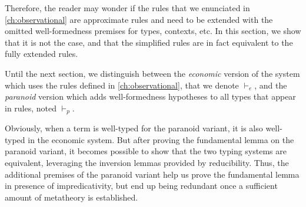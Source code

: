 Therefore, the reader may wonder if the rules that we enunciated in 
\cref{ch:observational} are approximate rules and need to be extended 
with the omitted well-formedness premises for types, contexts, etc.
% 
In this section, we show that it is not the case, and that the simplified 
rules are in fact equivalent to the fully extended rules.

% 
Until the next section, we distinguish between the \emph{economic} version of the 
system which uses the rules defined in \cref{ch:observational}, that we denote 
\( \vdash_e \), and the \emph{paranoid} version which adds well-formedness
hypotheses to all types that appear in rules, noted \( \vdash_p \).

Obviously, when a term is well-typed for the paranoid variant, it is
also well-typed in the economic system. But after proving the
fundamental lemma on the paranoid variant, it becomes possible to show
that the two typing systems are equivalent, leveraging the inversion
lemmas provided by reducibility.
%
% 
Thus, the additional premises of the paranoid variant help us
prove the fundamental lemma in presence of impredicativity, but end up
being redundant once a sufficient amount of metatheory is established.

